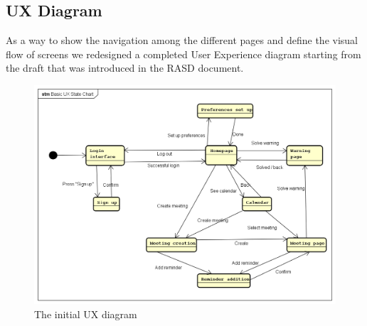 \subsection{UX Diagram}
As a way to show the navigation among the different pages and define the visual flow of screens we redesigned a completed User Experience diagram starting from the draft that was introduced in the RASD document.

\begin{center}
\begin{figure}[htp] 
\includegraphics[width=\textwidth]{images/basicux} 
\caption{The initial UX diagram} 
\label{fig:basicux} 
\end{figure} 
\end{center}





